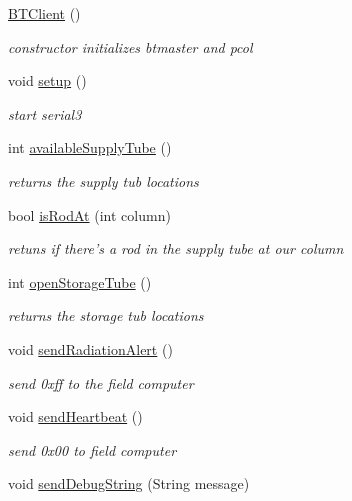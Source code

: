 \begin{DoxyCompactItemize}
\item 
\hyperlink{classBTClient_a60dc22e0906a1cea7a88813bb6d98f96}{B\-T\-Client} ()
\begin{DoxyCompactList}\small\item\em constructor initializes btmaster and pcol \end{DoxyCompactList}\item 
void \hyperlink{classBTClient_aefdc156fe1f22455d249ec0bb7fa3fd5}{setup} ()
\begin{DoxyCompactList}\small\item\em start serial3 \end{DoxyCompactList}\item 
int \hyperlink{classBTClient_a67250c48f81fee2b7c9f26d100c26799}{available\-Supply\-Tube} ()
\begin{DoxyCompactList}\small\item\em returns the supply tub locations \end{DoxyCompactList}\item 
bool \hyperlink{classBTClient_a3140dacfc561f8c122a76961cc71f9d9}{is\-Rod\-At} (int column)
\begin{DoxyCompactList}\small\item\em retuns if there's a rod in the supply tube at our column \end{DoxyCompactList}\item 
int \hyperlink{classBTClient_a18e2223a0605a0ee67b5d004890b38c4}{open\-Storage\-Tube} ()
\begin{DoxyCompactList}\small\item\em returns the storage tub locations \end{DoxyCompactList}\item 
void \hyperlink{classBTClient_a70cc30b8de8632bd6fb81972a9409a10}{send\-Radiation\-Alert} ()
\begin{DoxyCompactList}\small\item\em send 0xff to the field computer \end{DoxyCompactList}\item 
void \hyperlink{classBTClient_a4bf8f58f2c83834cab585e69c55c171f}{send\-Heartbeat} ()
\begin{DoxyCompactList}\small\item\em send 0x00 to field computer \end{DoxyCompactList}\item 
void \hyperlink{classBTClient_a57a82b64a1233a66450c1d9ebe48774c}{send\-Debug\-String} (String message)

\end{DoxyCompactItemize}
